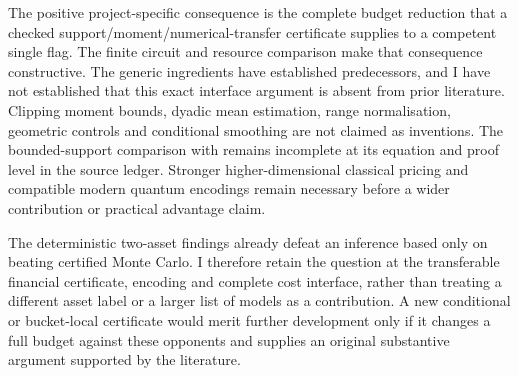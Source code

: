 The positive project-specific consequence is the complete budget reduction
that a checked support/moment/numerical-transfer certificate supplies to a
competent single flag. The finite circuit and resource comparison make that
consequence constructive. The generic ingredients have established
predecessors, and I have not established that this exact interface argument is
absent from prior literature. Clipping moment bounds, dyadic mean estimation,
range normalisation, geometric controls and conditional smoothing are not
claimed as inventions. The bounded-support comparison with \citet{liuli2009} remains
incomplete at its equation and proof level in the source ledger. Stronger
higher-dimensional classical pricing and compatible modern quantum encodings
remain necessary before a wider contribution or practical advantage claim.

The deterministic two-asset findings already defeat an inference based only
on beating certified Monte Carlo. I therefore retain the question at the
transferable financial certificate, encoding and complete cost interface,
rather than treating a different asset label or a larger list of models as a
contribution. A new conditional or bucket-local certificate would merit
further development only if it changes a full budget against these opponents
and supplies an original substantive argument supported by the literature.
